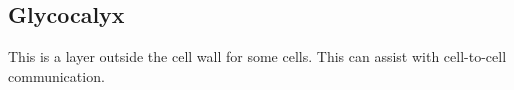 
\subsection{Glycocalyx}

This is a layer outside the cell wall for some cells. This can assist with cell-to-cell communication.

